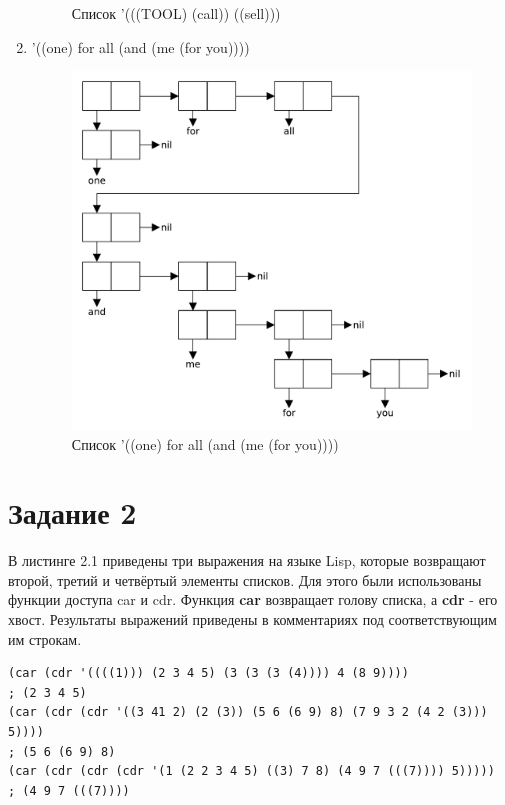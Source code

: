 \begin{enumerate}
\begin{figure}[H]
            \caption{Список '(((TOOL) (call)) ((sell)))}
        \end{figure}
    \item '((one) for all (and (me (for you))))
        \begin{figure}[H]
            \centering
            \includegraphics[scale=0.60]{data/pdf/01-06.pdf}
            \caption{Список '((one) for all (and (me (for you))))}
        \end{figure}
\end{enumerate}

\section{Задание \No{}2}

В листинге 2.1 приведены три выражения на языке Lisp, которые возвращают второй, третий и четвёртый элементы списков. Для этого были использованы функции доступа car и cdr. Функция \textbf{car} возвращает голову списка, а \textbf{cdr} - его хвост. Результаты выражений приведены в комментариях под соответствующим им строкам.

\lstset{language=lisp}
\begin{lstlisting}[caption={Выражения, возвращающие 2, 3 и 4 элементы списка}]
(car (cdr '((((1))) (2 3 4 5) (3 (3 (3 (4)))) 4 (8 9))))
; (2 3 4 5)
(car (cdr (cdr '((3 41 2) (2 (3)) (5 6 (6 9) 8) (7 9 3 2 (4 2 (3))) 5))))
; (5 6 (6 9) 8)
(car (cdr (cdr (cdr '(1 (2 2 3 4 5) ((3) 7 8) (4 9 7 (((7)))) 5)))))
; (4 9 7 (((7))))
\end{lstlisting}

